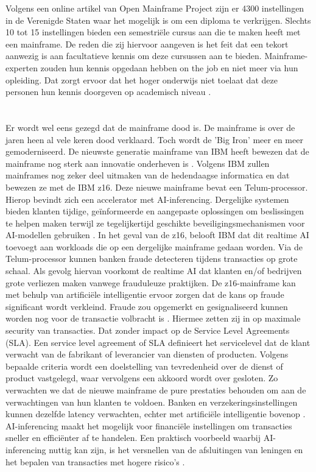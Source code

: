 Volgens een online artikel van Open Mainframe Project \autocite{2020} zijn er 4300 instellingen in de Verenigde Staten waar het mogelijk is om een diploma te verkrijgen. Slechts 10 tot 15 instellingen bieden een semestriële cursus aan die te maken heeft met een mainframe. De reden die zij hiervoor aangeven is het feit dat een tekort aanwezig is aan facultatieve kennis om deze cursussen aan te bieden. Mainframe-experten zouden hun kennis opgedaan hebben on the job en niet meer via hun opleiding. Dat zorgt ervoor dat het hoger onderwijs niet toelaat dat deze personen hun kennis doorgeven op academisch niveau \autocite{2020}. 

\section{}
\label{sec:De laatste nieuwe mainframe technologie}

Er wordt wel eens gezegd dat de mainframe dood is. De mainframe is over de jaren heen al vele keren dood verklaard. Toch wordt de 'Big Iron' meer en meer gemoderniseerd. De nieuwste generatie mainframe van IBM heeft bewezen dat de mainframe nog sterk aan innovatie onderheven is \autocite{Almekinders2022}. Volgens IBM zullen mainframes nog zeker deel uitmaken van de hedendaagse informatica en dat bewezen ze met de IBM z16. Deze nieuwe mainframe bevat een Telum-processor. Hierop bevindt zich een accelerator met AI-inferencing. Dergelijke systemen bieden klanten tijdige, geïnformeerde en aangepaste oplossingen om beslissingen te helpen maken terwijl ze tegelijkertijd geschikte beveiligingsmechanismen voor AI-modellen gebruiken \autocite{Cammarota2020}. In het geval van de z16, belooft IBM dat dit realtime AI toevoegt aan workloads die op een dergelijke mainframe gedaan worden. Via de Telum-processor kunnen banken fraude detecteren tijdens transacties op grote schaal. Als gevolg hiervan voorkomt de realtime AI dat klanten en/of bedrijven grote verliezen maken vanwege frauduleuze praktijken. De z16-mainframe kan met behulp van artificiële intelligentie ervoor zorgen dat de kans op fraude significant wordt verkleind. Fraude zou opgemerkt en gesignaliseerd kunnen worden nog voor de transactie volbracht is \autocite{Saran2022}. Hiermee zetten zij in op maximale security van transacties. Dat zonder impact op de Service Level Agreements (SLA). Een service level agreement of SLA definieert het servicelevel dat de klant verwacht van de fabrikant of leverancier van diensten of producten. Volgens bepaalde criteria wordt een doelstelling van tevredenheid over de dienst of product vastgelegd, waar vervolgens een akkoord wordt over gesloten. Zo verwachten we dat de nieuwe mainframe de pure prestaties behouden om aan de verwachtingen van hun klanten te voldoen. Banken en verzekeringsinstellingen kunnen dezelfde latency verwachten, echter met artificiële intelligentie bovenop \autocite{Saran2022}. AI-inferencing maakt het mogelijk voor financiële instellingen om transacties sneller en efficiënter af te handelen. Een praktisch voorbeeld waarbij AI-inferencing nuttig kan zijn, is het versnellen van de afsluitingen van leningen en het bepalen van transacties met hogere risico's \autocite{Saran2022}.


